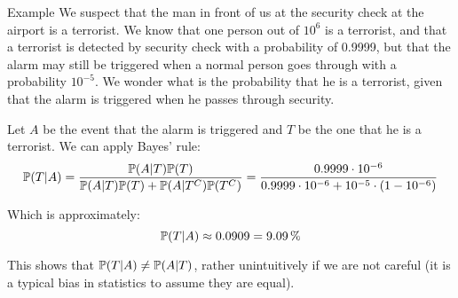 \documentclass[a4paper]{article}
\begin{document}
\begin{parag}{Example}
    We suspect that the man in front of us at the security check at the airport is a terrorist. We know that one person out of $10^6$ is a terrorist, and that a terrorist is detected by security check with a probability of 0.9999, but that the alarm may still be triggered when a normal person goes through with a probability $10^{-5}$. We wonder what is the probability that he is a terrorist, given that the alarm is triggered when he passes through security.

    Let $A$ be the event that the alarm is triggered and $T$ be the one that he is a terrorist. We can apply Bayes' rule: 
    \[\prob\left(T | A\right) = \frac{\prob\left(A |T\right)\prob\left(T\right)}{\prob\left(A|T\right)\prob\left(T\right) + \prob\left(A|T^C\right)\prob\left(T^C\right)} = \frac{0.9999 \cdot 10^{-6}}{0.9999\cdot 10^{-6} + 10^{-5}\cdot \left(1 - 10^{-6}\right)}\]

    Which is approximately: 
    \[\prob\left(T|A\right) \approx 0.0909 = \SI{9.09}{\percent}\]
    
    
    This shows that $\prob\left(T | A\right) \neq \prob\left(A | T\right)$, rather unintuitively if we are not careful (it is a typical bias in statistics to assume they are equal).
\end{parag}
\end{document}
